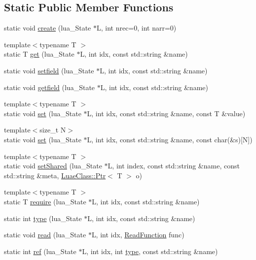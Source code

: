 \subsection*{Static Public Member Functions}
\begin{DoxyCompactItemize}
\item 
static void \hyperlink{a00044_ab8761e070cb40d555913ceedf72e20b2}{create} (lua\-\_\-\-State $\ast$L, int nrec=0, int narr=0)
\item 
{\footnotesize template$<$typename T $>$ }\\static T \hyperlink{a00044_a4c3c2c2cfea3c0727a700413a91f86f0}{get} (lua\-\_\-\-State $\ast$L, int idx, const std\-::string \&name)
\item 
static void \hyperlink{a00044_afa49b9670fbdf8e437338cb7c3e4a721}{setfield} (lua\-\_\-\-State $\ast$L, int idx, const std\-::string \&name)
\item 
static void \hyperlink{a00044_aa1413d555ab5a26f042b6419d6cc1194}{getfield} (lua\-\_\-\-State $\ast$L, int idx, const std\-::string \&name)
\item 
{\footnotesize template$<$typename T $>$ }\\static void \hyperlink{a00044_a83523b8a94b260062de7187da0010019}{set} (lua\-\_\-\-State $\ast$L, int idx, const std\-::string \&name, const T \&value)
\item 
{\footnotesize template$<$size\-\_\-t N$>$ }\\static void \hyperlink{a00044_a58d550f29903e9bde8b78526547a6e7b}{set} (lua\-\_\-\-State $\ast$L, int idx, const std\-::string \&name, const char(\&s)\mbox{[}N\mbox{]})
\item 
{\footnotesize template$<$typename T $>$ }\\static void \hyperlink{a00044_aeb3fd26e671004f598b35e941eaa9602}{set\-Shared} (lua\-\_\-\-State $\ast$L, int index, const std\-::string \&name, const std\-::string \&meta, \hyperlink{a00041_a213f5d206d7bcfe4712ed9eacad9f0ce}{Luae\-Class\-::\-Ptr}$<$ T $>$ o)
\item 
{\footnotesize template$<$typename T $>$ }\\static T \hyperlink{a00044_aba96fad8dbc7b62907f79ad28d5b8698}{require} (lua\-\_\-\-State $\ast$L, int idx, const std\-::string \&name)
\item 
static int \hyperlink{a00044_a360be9d74a19b8396d24e92a7120692d}{type} (lua\-\_\-\-State $\ast$L, int idx, const std\-::string \&name)
\item 
static void \hyperlink{a00044_a30043faca6031fb6cad7bf23029d8112}{read} (lua\-\_\-\-State $\ast$L, int idx, \hyperlink{a00044_a9cf9541d4e6a0c0e659582029b5e015a}{Read\-Function} func)
\item 
static int \hyperlink{a00044_a9d8db4bd19d0d5c554600c5e9692cfc8}{ref} (lua\-\_\-\-State $\ast$L, int idx, int \hyperlink{a00044_a360be9d74a19b8396d24e92a7120692d}{type}, const std\-::string \&name)
\end{DoxyCompactItemize}


